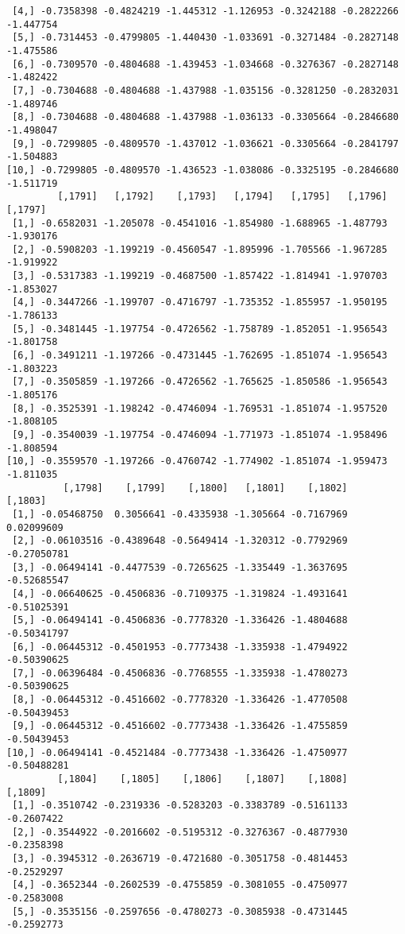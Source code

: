 \documentclass[
  letterpaper,
  DIV=11,
  numbers=noendperiod]{scrreprt}
\begin{document}
\begin{verbatim}
 [4,] -0.7358398 -0.4824219 -1.445312 -1.126953 -0.3242188 -0.2822266 -1.447754
 [5,] -0.7314453 -0.4799805 -1.440430 -1.033691 -0.3271484 -0.2827148 -1.475586
 [6,] -0.7309570 -0.4804688 -1.439453 -1.034668 -0.3276367 -0.2827148 -1.482422
 [7,] -0.7304688 -0.4804688 -1.437988 -1.035156 -0.3281250 -0.2832031 -1.489746
 [8,] -0.7304688 -0.4804688 -1.437988 -1.036133 -0.3305664 -0.2846680 -1.498047
 [9,] -0.7299805 -0.4809570 -1.437012 -1.036621 -0.3305664 -0.2841797 -1.504883
[10,] -0.7299805 -0.4809570 -1.436523 -1.038086 -0.3325195 -0.2846680 -1.511719
         [,1791]   [,1792]    [,1793]   [,1794]   [,1795]   [,1796]   [,1797]
 [1,] -0.6582031 -1.205078 -0.4541016 -1.854980 -1.688965 -1.487793 -1.930176
 [2,] -0.5908203 -1.199219 -0.4560547 -1.895996 -1.705566 -1.967285 -1.919922
 [3,] -0.5317383 -1.199219 -0.4687500 -1.857422 -1.814941 -1.970703 -1.853027
 [4,] -0.3447266 -1.199707 -0.4716797 -1.735352 -1.855957 -1.950195 -1.786133
 [5,] -0.3481445 -1.197754 -0.4726562 -1.758789 -1.852051 -1.956543 -1.801758
 [6,] -0.3491211 -1.197266 -0.4731445 -1.762695 -1.851074 -1.956543 -1.803223
 [7,] -0.3505859 -1.197266 -0.4726562 -1.765625 -1.850586 -1.956543 -1.805176
 [8,] -0.3525391 -1.198242 -0.4746094 -1.769531 -1.851074 -1.957520 -1.808105
 [9,] -0.3540039 -1.197754 -0.4746094 -1.771973 -1.851074 -1.958496 -1.808594
[10,] -0.3559570 -1.197266 -0.4760742 -1.774902 -1.851074 -1.959473 -1.811035
          [,1798]    [,1799]    [,1800]   [,1801]    [,1802]     [,1803]
 [1,] -0.05468750  0.3056641 -0.4335938 -1.305664 -0.7167969  0.02099609
 [2,] -0.06103516 -0.4389648 -0.5649414 -1.320312 -0.7792969 -0.27050781
 [3,] -0.06494141 -0.4477539 -0.7265625 -1.335449 -1.3637695 -0.52685547
 [4,] -0.06640625 -0.4506836 -0.7109375 -1.319824 -1.4931641 -0.51025391
 [5,] -0.06494141 -0.4506836 -0.7778320 -1.336426 -1.4804688 -0.50341797
 [6,] -0.06445312 -0.4501953 -0.7773438 -1.335938 -1.4794922 -0.50390625
 [7,] -0.06396484 -0.4506836 -0.7768555 -1.335938 -1.4780273 -0.50390625
 [8,] -0.06445312 -0.4516602 -0.7778320 -1.336426 -1.4770508 -0.50439453
 [9,] -0.06445312 -0.4516602 -0.7773438 -1.336426 -1.4755859 -0.50439453
[10,] -0.06494141 -0.4521484 -0.7773438 -1.336426 -1.4750977 -0.50488281
         [,1804]    [,1805]    [,1806]    [,1807]    [,1808]    [,1809]
 [1,] -0.3510742 -0.2319336 -0.5283203 -0.3383789 -0.5161133 -0.2607422
 [2,] -0.3544922 -0.2016602 -0.5195312 -0.3276367 -0.4877930 -0.2358398
 [3,] -0.3945312 -0.2636719 -0.4721680 -0.3051758 -0.4814453 -0.2529297
 [4,] -0.3652344 -0.2602539 -0.4755859 -0.3081055 -0.4750977 -0.2583008
 [5,] -0.3535156 -0.2597656 -0.4780273 -0.3085938 -0.4731445 -0.2592773

\end{verbatim}
\end{document}
